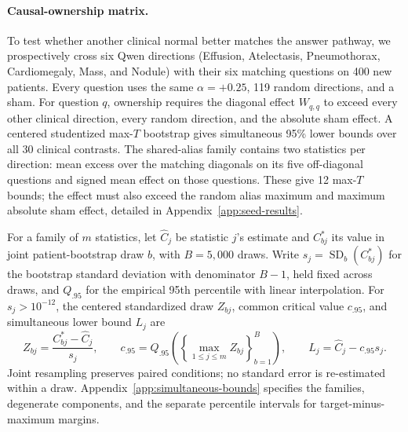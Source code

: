 \documentclass{article}
\begin{document}
\paragraph{Causal-ownership matrix.}
To test whether another clinical normal better matches the answer pathway, we prospectively cross six Qwen directions (Effusion, Atelectasis, Pneumothorax, Cardiomegaly, Mass, and Nodule) with their six matching questions on 400 new patients. Every question uses the same $\alpha=+0.25$, 119 random directions, and a sham. For question $q$, ownership requires the diagonal effect $W_{q,q}$ to exceed every other clinical direction, every random direction, and the absolute sham effect. A centered studentized max-$T$ bootstrap gives simultaneous 95\% lower bounds over all 30 clinical contrasts. The shared-alias family contains two statistics per direction: mean excess over the matching diagonals on its five off-diagonal questions and signed mean effect on those questions. These give 12 max-$T$ bounds; the effect must also exceed the random alias maximum and maximum absolute sham effect, detailed in Appendix~\ref{app:seed-results}.

For a family of $m$ statistics, let $\widehat C_j$ be statistic $j$'s estimate and $C^*_{bj}$ its value in joint patient-bootstrap draw $b$, with $B=5{,}000$ draws. Write $s_j=\operatorname{SD}_{b}(C^*_{bj})$ for the bootstrap standard deviation with denominator $B-1$, held fixed across draws, and $Q_{.95}$ for the empirical 95th percentile with linear interpolation. For $s_j>10^{-12}$, the centered standardized draw $Z_{bj}$, common critical value $c_{.95}$, and simultaneous lower bound $L_j$ are
\begin{equation}
Z_{bj}=\frac{C^*_{bj}-\widehat C_j}{s_j},\qquad
c_{.95}=Q_{.95}\!\left(\left\{\max_{1\leq j\leq m}Z_{bj}\right\}_{b=1}^{B}\right),\qquad
L_j=\widehat C_j-c_{.95}s_j.
\label{eq:max-t}
\end{equation}
Joint resampling preserves paired conditions; no standard error is re-estimated within a draw. Appendix~\ref{app:simultaneous-bounds} specifies the families, degenerate components, and the separate percentile intervals for target-minus-maximum margins.
\end{document}
